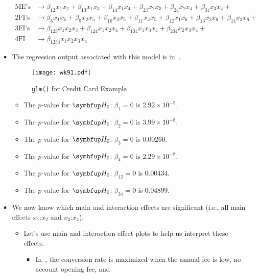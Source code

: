 \begin{itemize}
\begin{align*}
              \text{ME's}      & \to\beta_{12}x_1x_2+\beta_{13}x_1x_3+\beta_{14}x_1x_4+\beta_{23}x_2x_3+\beta_{24}x_2x_4+\beta_{34}x_3x_4+              \\
              \text{2FI's}     & \to\beta_{8}x_1x_5+\beta_9x_2x_5+\beta_{10}x_3x_5+\beta_{11}x_4x_5+\beta_{12}x_1x_6+\beta_{13}x_2x_6+\beta_{14}x_3x_6+ \\
              \text{3FI's}     & \to\beta_{123}x_1x_2x_3+\beta_{124}x_1x_2x_4+\beta_{134}x_1x_3x_4+\beta_{234}x_2x_3x_4+                                \\
              \text{4FI}       & \to\beta_{1234}x_1x_2x_3x_4
          \end{align*}
    \item The regression output associated with this model is in~.
          \begin{figure}[!htbp]
              \centering
              \caption{\texttt{glm()} for Credit Card Example}\label{fig:wk91}
              \texttt{[image: wk91.pdf]}
          \end{figure}
          \begin{itemize}
              \item The $ p $-value for $ \HN $: $ \beta_1=0 $ is $ 2.92\times 10^{-5} $.
              \item The $ p $-value for $ \HN $: $ \beta_2=0 $ is $ 3.99\times 10^{-8} $.
              \item The $ p $-value for $ \HN $: $ \beta_3=0 $ is $ 0.00260 $.
              \item The $ p $-value for $ \HN $: $ \beta_4=0 $ is $ 2.29\times 10^{-8} $.
              \item The $ p $-value for $ \HN $: $ \beta_{12}=0 $ is $ 0.00434 $.
              \item The $ p $-value for $ \HN $: $ \beta_{34}=0 $ is $ 0.04899 $.
          \end{itemize}
    \item We now know which main and interaction effects are significant (i.e., all main effects $ x_1 $:$ x_2 $ and $ x_3 $:$ x_4 $).
          \begin{itemize}
              \item Let's use main and interaction effect plots to help us interpret these effects.
                    \begin{itemize}
                        \item In~, the conversion rate is maximized when the annual fee is low, no account opening fee, and

\end{itemize}
\end{itemize}
\end{itemize}
